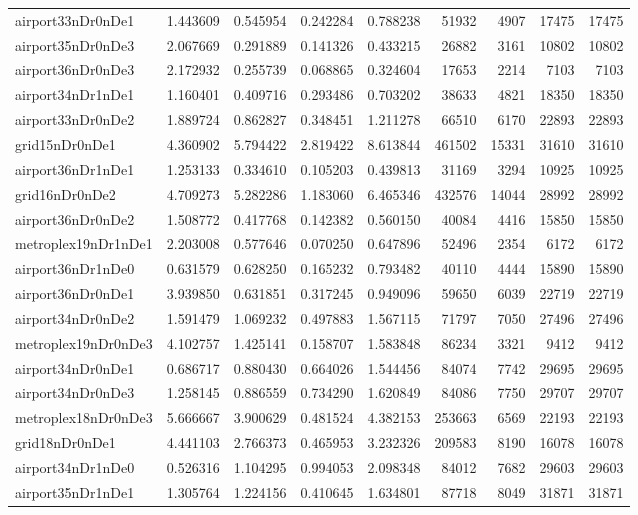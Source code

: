 \begin{longtable}{|l|r|r|r|r|r|r|r|r|}
airport33nDr0nDe1 & 1.443609 & 0.545954 & 0.242284 & 0.788238 & 51932 & 4907 & 17475 & 17475 \\
airport35nDr0nDe3 & 2.067669 & 0.291889 & 0.141326 & 0.433215 & 26882 & 3161 & 10802 & 10802 \\
airport36nDr0nDe3 & 2.172932 & 0.255739 & 0.068865 & 0.324604 & 17653 & 2214 & 7103 & 7103 \\
airport34nDr1nDe1 & 1.160401 & 0.409716 & 0.293486 & 0.703202 & 38633 & 4821 & 18350 & 18350 \\
airport33nDr0nDe2 & 1.889724 & 0.862827 & 0.348451 & 1.211278 & 66510 & 6170 & 22893 & 22893 \\
grid15nDr0nDe1 & 4.360902 & 5.794422 & 2.819422 & 8.613844 & 461502 & 15331 & 31610 & 31610 \\
airport36nDr1nDe1 & 1.253133 & 0.334610 & 0.105203 & 0.439813 & 31169 & 3294 & 10925 & 10925 \\
grid16nDr0nDe2 & 4.709273 & 5.282286 & 1.183060 & 6.465346 & 432576 & 14044 & 28992 & 28992 \\
airport36nDr0nDe2 & 1.508772 & 0.417768 & 0.142382 & 0.560150 & 40084 & 4416 & 15850 & 15850 \\
metroplex19nDr1nDe1 & 2.203008 & 0.577646 & 0.070250 & 0.647896 & 52496 & 2354 & 6172 & 6172 \\
airport36nDr1nDe0 & 0.631579 & 0.628250 & 0.165232 & 0.793482 & 40110 & 4444 & 15890 & 15890 \\
airport36nDr0nDe1 & 3.939850 & 0.631851 & 0.317245 & 0.949096 & 59650 & 6039 & 22719 & 22719 \\
airport34nDr0nDe2 & 1.591479 & 1.069232 & 0.497883 & 1.567115 & 71797 & 7050 & 27496 & 27496 \\
metroplex19nDr0nDe3 & 4.102757 & 1.425141 & 0.158707 & 1.583848 & 86234 & 3321 & 9412 & 9412 \\
airport34nDr0nDe1 & 0.686717 & 0.880430 & 0.664026 & 1.544456 & 84074 & 7742 & 29695 & 29695 \\
airport34nDr0nDe3 & 1.258145 & 0.886559 & 0.734290 & 1.620849 & 84086 & 7750 & 29707 & 29707 \\
metroplex18nDr0nDe3 & 5.666667 & 3.900629 & 0.481524 & 4.382153 & 253663 & 6569 & 22193 & 22193 \\
grid18nDr0nDe1 & 4.441103 & 2.766373 & 0.465953 & 3.232326 & 209583 & 8190 & 16078 & 16078 \\
airport34nDr1nDe0 & 0.526316 & 1.104295 & 0.994053 & 2.098348 & 84012 & 7682 & 29603 & 29603 \\
airport35nDr1nDe1 & 1.305764 & 1.224156 & 0.410645 & 1.634801 & 87718 & 8049 & 31871 & 31871 \\

\end{longtable}
